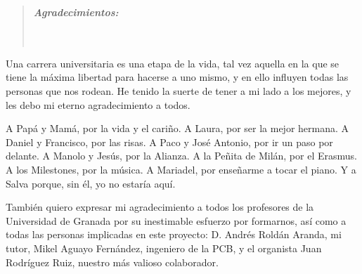 \cleardoublepage
{}
{}

\vspace*{2.5cm}


\begin{quotation}
\noindent \begin{center}
\textbf{\emph{\Large Agradecimientos:}}\textbf{\emph{\large }}\\
\textbf{\emph{\large }}\\
\textbf{\emph{\large }}\\
\textbf{\emph{\large }}
\par\end{center}{\large \par}
\end{quotation}

\begin{onehalfspace}

Una carrera universitaria es una etapa de la vida, tal vez aquella en la que se tiene la máxima libertad para hacerse a uno mismo, y en ello influyen todas las personas que nos rodean. He tenido la suerte de tener a mi lado a los mejores, y les debo mi eterno agradecimiento a todos.

A Papá y Mamá, por la vida y el cariño. A Laura, por ser la mejor hermana. A Daniel y Francisco, por las risas. A Paco y José Antonio, por ir un paso por delante. A Manolo y Jesús, por la Alianza. A la Peñita de Milán, por el Erasmus. A los Milestones, por la música. A Mariadel, por enseñarme a tocar el piano. Y a Salva porque, sin él, yo no estaría aquí.

También quiero expresar mi agradecimiento a todos los profesores de la Universidad de Granada por su inestimable esfuerzo por formarnos, así como a todas las personas implicadas en este proyecto: D. Andrés Roldán Aranda, mi tutor, Mikel Aguayo Fernández, ingeniero de la PCB, y el organista Juan Rodríguez Ruiz, nuestro más valioso colaborador.

\end{onehalfspace}


\clearpage{\pagestyle{empty}\cleardoublepage}%
